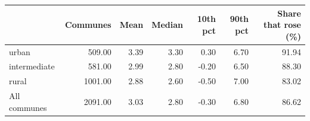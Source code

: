 \begin{tabular}{lrrrrrr}
\toprule
 & Communes & Mean & Median & 10th pct & 90th pct & Share that rose (\%) \\
\midrule
urban & 509.00 & 3.39 & 3.30 & 0.30 & 6.70 & 91.94 \\
intermediate & 581.00 & 2.99 & 2.80 & -0.20 & 6.50 & 88.30 \\
rural & 1001.00 & 2.88 & 2.60 & -0.50 & 7.00 & 83.02 \\
All communes & 2091.00 & 3.03 & 2.80 & -0.30 & 6.80 & 86.62 \\
\bottomrule
\end{tabular}

